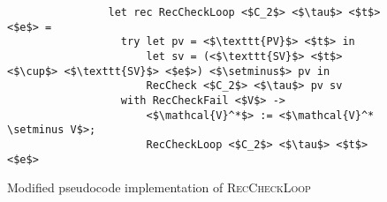 \begin{figure}
\centering

\begin{verbatim}
                let rec RecCheckLoop <$C_2$> <$\tau$> <$t$> <$e$> =
                  try let pv = <$\texttt{PV}$> <$t$> in
                      let sv = (<$\texttt{SV}$> <$t$> <$\cup$> <$\texttt{SV}$> <$e$>) <$\setminus$> pv in
                      RecCheck <$C_2$> <$\tau$> pv sv
                  with RecCheckFail <$V$> ->
                      <$\mathcal{V}^*$> := <$\mathcal{V}^* \setminus V$>;
                      RecCheckLoop <$C_2$> <$\tau$> <$t$> <$e$>
\end{verbatim}

\caption{Modified pseudocode implementation of \textsc{RecCheckLoop}}
\label{fig:simpl-helpers}
\end{figure}

